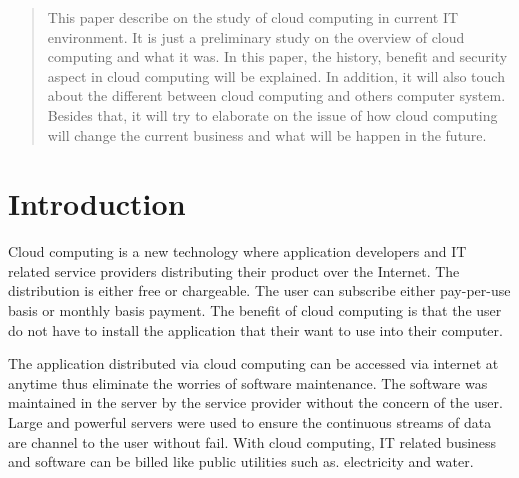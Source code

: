 \documentclass[conference, compsoc]{IEEEtran}
\begin{document}
\begin{abstract}
This paper describe on the study of cloud computing in current IT environment. It is just a preliminary study on the overview of cloud computing and what it was. In this paper, the history, benefit and security aspect in cloud computing will be explained. In addition, it will also touch about the different between cloud computing and others computer system. Besides that, it will try to elaborate on the issue of how cloud computing will change the current business and what will be happen in the future. 

\end{abstract}





%
\IEEEpeerreviewmaketitle



\section{Introduction}
Cloud computing is a new technology where application developers and IT related service providers distributing their product over the Internet. The distribution is either free or chargeable. The user can subscribe either pay-per-use basis or monthly basis payment. The benefit of cloud computing is that the user do not have to install the application that their want to use into their computer.

The application distributed via cloud computing can be accessed via internet at anytime thus eliminate the worries of software maintenance. The software was maintained in the server by the service provider without the concern of the user. Large and powerful servers were used to ensure the continuous streams of data are channel to the user without fail. With cloud computing, IT related business and software can be billed like public utilities such as. electricity and water. 
\end{document}
